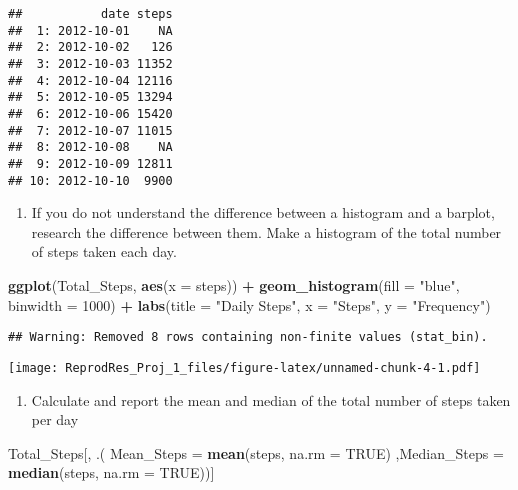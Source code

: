 \documentclass[
]{article}
\newenvironment{Shaded}{\begin{snugshade}}{\end{snugshade}}
\newcommand{\DataTypeTok}[1]{\textcolor[rgb]{0.13,0.29,0.53}{#1}}
\newcommand{\DecValTok}[1]{\textcolor[rgb]{0.00,0.00,0.81}{#1}}
\newcommand{\KeywordTok}[1]{\textcolor[rgb]{0.13,0.29,0.53}{\textbf{#1}}}
\newcommand{\NormalTok}[1]{#1}
\newcommand{\OperatorTok}[1]{\textcolor[rgb]{0.81,0.36,0.00}{\textbf{#1}}}
\newcommand{\OtherTok}[1]{\textcolor[rgb]{0.56,0.35,0.01}{#1}}
\newcommand{\StringTok}[1]{\textcolor[rgb]{0.31,0.60,0.02}{#1}}
\providecommand{\tightlist}{%
  \setlength{\itemsep}{0pt}\setlength{\parskip}{0pt}}
\begin{document}
\begin{verbatim}
##           date steps
##  1: 2012-10-01    NA
##  2: 2012-10-02   126
##  3: 2012-10-03 11352
##  4: 2012-10-04 12116
##  5: 2012-10-05 13294
##  6: 2012-10-06 15420
##  7: 2012-10-07 11015
##  8: 2012-10-08    NA
##  9: 2012-10-09 12811
## 10: 2012-10-10  9900
\end{verbatim}

\begin{enumerate}
\def\labelenumi{\arabic{enumi}.}
\setcounter{enumi}{1}
\tightlist
\item
  If you do not understand the difference between a histogram and a
  barplot, research the difference between them. Make a histogram of the
  total number of steps taken each day.
\end{enumerate}

\begin{Shaded}
\begin{Highlighting}[]
\KeywordTok{ggplot}\NormalTok{(Total_Steps, }\KeywordTok{aes}\NormalTok{(}\DataTypeTok{x =}\NormalTok{ steps)) }\OperatorTok{+}
\StringTok{    }\KeywordTok{geom_histogram}\NormalTok{(}\DataTypeTok{fill =} \StringTok{"blue"}\NormalTok{, }\DataTypeTok{binwidth =} \DecValTok{1000}\NormalTok{) }\OperatorTok{+}
\StringTok{    }\KeywordTok{labs}\NormalTok{(}\DataTypeTok{title =} \StringTok{"Daily Steps"}\NormalTok{, }\DataTypeTok{x =} \StringTok{"Steps"}\NormalTok{, }\DataTypeTok{y =} \StringTok{"Frequency"}\NormalTok{)}
\end{Highlighting}
\end{Shaded}

\begin{verbatim}
## Warning: Removed 8 rows containing non-finite values (stat_bin).
\end{verbatim}

\texttt{[image: ReprodRes\_Proj\_1\_files/figure-latex/unnamed-chunk-4-1.pdf]}

\begin{enumerate}
\def\labelenumi{\arabic{enumi}.}
\setcounter{enumi}{2}
\tightlist
\item
  Calculate and report the mean and median of the total number of steps
  taken per day
\end{enumerate}

\begin{Shaded}
\begin{Highlighting}[]
\NormalTok{Total_Steps[, .( }\DataTypeTok{Mean_Steps =} \KeywordTok{mean}\NormalTok{(steps, }\DataTypeTok{na.rm =} \OtherTok{TRUE}\NormalTok{)}
\NormalTok{                ,}\DataTypeTok{Median_Steps =} \KeywordTok{median}\NormalTok{(steps, }\DataTypeTok{na.rm =} \OtherTok{TRUE}\NormalTok{))]}
\end{Highlighting}
\end{Shaded}
\end{document}
